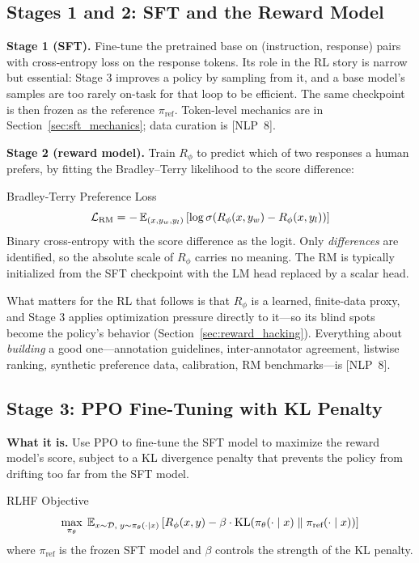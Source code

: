 \subsection{Stages 1 and 2: SFT and the Reward Model}

\textbf{Stage 1 (SFT).} Fine-tune the pretrained base on (instruction, response) pairs with cross-entropy loss on the response tokens. Its role in the RL story is narrow but essential: Stage 3 improves a policy by sampling from it, and a base model's samples are too rarely on-task for that loop to be efficient. The same checkpoint is then frozen as the reference $\pi_{\text{ref}}$. Token-level mechanics are in Section~\ref{sec:sft_mechanics}; data curation is [NLP~8].

\textbf{Stage 2 (reward model).} Train $R_\phi$ to predict which of two responses a human prefers, by fitting the Bradley--Terry likelihood to the score difference:

\begin{mathresult}{Bradley-Terry Preference Loss}
\begin{equation}
\mathcal{L}_{\text{RM}} = -\operatorname{\mathbb{E}}_{(x, y_w, y_l)}\left[\log \sigma\!\left(R_\phi(x, y_w) - R_\phi(x, y_l)\right)\right]
\end{equation}
Binary cross-entropy with the score difference as the logit. Only \textit{differences} are identified, so the absolute scale of $R_\phi$ carries no meaning. The RM is typically initialized from the SFT checkpoint with the LM head replaced by a scalar head.
\end{mathresult}

What matters for the RL that follows is that $R_\phi$ is a learned, finite-data proxy, and Stage 3 applies optimization pressure directly to it---so its blind spots become the policy's behavior (Section~\ref{sec:reward_hacking}). Everything about \textit{building} a good one---annotation guidelines, inter-annotator agreement, listwise ranking, synthetic preference data, calibration, RM benchmarks---is [NLP~8].

\subsection{Stage 3: PPO Fine-Tuning with KL Penalty}

\textbf{What it is.} Use PPO to fine-tune the SFT model to maximize the reward model's score, subject to a KL divergence penalty that prevents the policy from drifting too far from the SFT model.

\begin{mathresult}{RLHF Objective}
\begin{equation}
\max_{\pi_\theta}\; \operatorname{\mathbb{E}}_{x \sim \mathcal{D},\; y \sim \pi_\theta(\cdot \mid x)}\left[R_\phi(x, y) - \beta \cdot \operatorname{KL}\!\left(\pi_\theta(\cdot \mid x)\;\|\;\pi_{\text{ref}}(\cdot \mid x)\right)\right]
\end{equation}
where $\pi_{\text{ref}}$ is the frozen SFT model and $\beta$ controls the strength of the KL penalty.
\end{mathresult}

